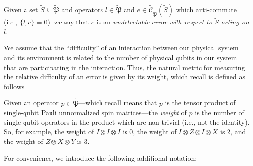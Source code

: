 \documentclass[twocolumn,showpacs,preprintnumbers,amsmath,amssymb,nofootinbib,pra,floatfix]{revtex4-1}
\newenvironment{definition}[1][Definition]{\begin{trivlist}
\item[\hskip \labelsep {\bfseries #1}]}{\end{trivlist}}
\newcommand{\set}{\tilde}
\newcommand{\pauligroup}{{\set{\mathfrak{P}}}}
\newcommand{\centralizer}{\set{\mathcal{C}}}
\begin{document}
\begin{definition}
Given a set $\set S\subseteq\pauligroup$ and operators $l\in\pauligroup$ and $e\in\centralizer_\pauligroup(\set S)$ which anti-commute (i.e., $\{l,e\}=0$), we say that $e$ is an \emph{undetectable error with respect to} $\set S$ \emph{acting on} $l$.
\end{definition}
We assume that the ``difficulty'' of an interaction between our physical system and its environment is related to the number of physical qubits in our system that are participating in the interaction.  Thus, the natural metric for measuring the relative difficulty of an error is given by its weight, which recall is defined as follows:

\begin{definition}
Given an operator $p\in\pauligroup$---which recall means that $p$ is the tensor product of single-qubit Pauli unnormalized spin matrices---the \emph{weight} of $p$ is the number of single-qubit operators in the product which are non-trivial (i.e., not the identity).  So, for example, the weight of $I\otimes I\otimes I$ is 0, the weight of $I\otimes Z\otimes I\otimes X$ is 2, and the weight of $Z\otimes X\otimes Y$ is 3.
\end{definition}
For convenience, we introduce the following additional notation:
\end{document}
